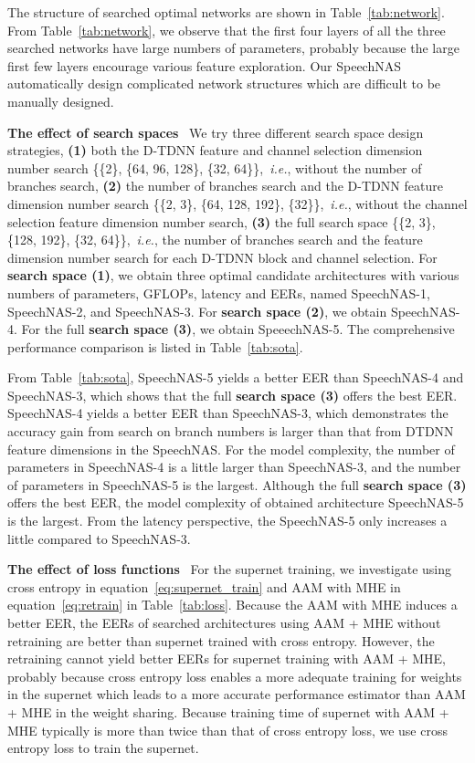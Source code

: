 \documentclass{article}
\def\ie{\emph{i.e.}}
\begin{document}
The structure of searched optimal networks are shown in Table~\ref{tab:network}. From Table~\ref{tab:network}, we observe that the first four layers of all the three searched networks have large numbers of parameters, probably because the large first few layers encourage various feature exploration. Our SpeechNAS automatically design complicated network structures which are difficult to be manually designed.  

\textbf{The effect of search spaces} \, We try three different search space design strategies, \textbf{(1)} both the D-TDNN feature and channel selection dimension number search \{\{2\}, \{64, 96, 128\}, \{32, 64\}\},~\ie, without the number of branches search, \textbf{(2)} the number of branches search and the D-TDNN feature dimension number search \{\{2, 3\}, \{64, 128, 192\}, \{32\}\},~\ie, without the channel selection feature dimension number search, \textbf{(3)} the full search space \{\{2, 3\}, \{128, 192\}, \{32, 64\}\},~\ie, the number of branches search and the feature dimension number search for each D-TDNN block and channel selection. For \textbf{search space (1)}, we obtain three optimal candidate architectures with various numbers of parameters, GFLOPs, latency and EERs, named SpeechNAS-1, SpeechNAS-2, and SpeechNAS-3. For \textbf{search space (2)}, we obtain SpeechNAS-4. For the full \textbf{search space (3)}, we obtain SpeeechNAS-5. The comprehensive performance comparison is listed in Table~\ref{tab:sota}.  

From Table~\ref{tab:sota}, SpeechNAS-5 yields a better EER than SpeechNAS-4 and SpeechNAS-3, which shows that the full \textbf{search space (3)} offers the best EER. SpeechNAS-4 yields a better EER than SpeechNAS-3, which demonstrates the accuracy gain from search on branch numbers is larger than that from DTDNN feature dimensions in the SpeechNAS. For the model complexity, the number of parameters in SpeechNAS-4 is a little larger than SpeechNAS-3, and the number of parameters in SpeechNAS-5 is the largest. Although the full \textbf{search space (3)} offers the best EER, the model complexity of obtained architecture SpeechNAS-5 is the largest. From the latency perspective, the SpeechNAS-5 only increases a little compared to SpeechNAS-3.

\textbf{The effect of loss functions} \, For the supernet training, we investigate using cross entropy in equation~\eqref{eq:supernet_train} and AAM with MHE in equation~\eqref{eq:retrain} in Table~\ref{tab:loss}. Because the AAM with MHE induces a better EER, the EERs of searched architectures using AAM + MHE without retraining are better than supernet trained with cross entropy. However, the retraining cannot yield better EERs for supernet training with AAM + MHE, probably because cross entropy loss enables a more adequate training for weights in the supernet which leads to a more accurate performance estimator than AAM + MHE in the weight sharing. Because training time of supernet with AAM + MHE typically is more than twice than that of cross entropy loss, we use cross entropy loss to train the supernet.
\end{document}
